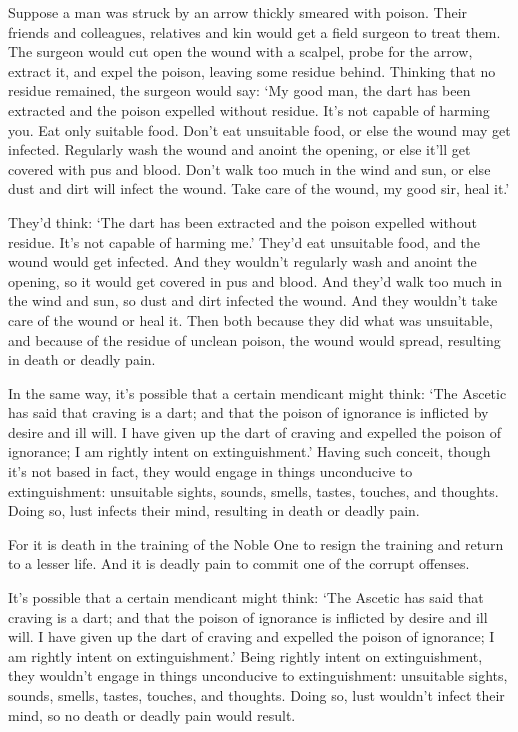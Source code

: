 \documentclass[12pt,openany]{book}%
\begin{document}
Suppose a man was struck by an arrow thickly smeared with poison. Their friends and colleagues, relatives and kin would get a field surgeon to treat them. The surgeon would cut open the wound with a scalpel, probe for the arrow, extract it, and expel the poison, leaving some residue behind. Thinking that no residue remained, the surgeon would say: ‘My good man, the dart has been extracted and the poison expelled without residue. It’s not capable of harming you. Eat only suitable food. Don’t eat unsuitable food, or else the wound may get infected. Regularly wash the wound and anoint the opening, or else it’ll get covered with pus and blood. Don’t walk too much in the wind and sun, or else dust and dirt will infect the wound. Take care of the wound, my good sir, heal it.’ 

They’d think: ‘The dart has been extracted and the poison expelled without residue. It’s not capable of harming me.’ They’d eat unsuitable food, and the wound would get infected. And they wouldn’t regularly wash and anoint the opening, so it would get covered in pus and blood. And they’d walk too much in the wind and sun, so dust and dirt infected the wound. And they wouldn’t take care of the wound or heal it. Then both because they did what was unsuitable, and because of the residue of unclean poison, the wound would spread, resulting in death or deadly pain. 

In the same way, it’s possible that a certain mendicant might think: ‘The Ascetic has said that craving is a dart; and that the poison of ignorance is inflicted by desire and ill will. I have given up the dart of craving and expelled the poison of ignorance; I am rightly intent on extinguishment.’ Having such conceit, though it’s not based in fact, they would engage in things unconducive to extinguishment: unsuitable sights, sounds, smells, tastes, touches, and thoughts. Doing so, lust infects their mind, resulting in death or deadly pain. 

For it is death in the training of the Noble One to resign the training and return to a lesser life. And it is deadly pain to commit one of the corrupt offenses. 

It’s possible that a certain mendicant might think: ‘The Ascetic has said that craving is a dart; and that the poison of ignorance is inflicted by desire and ill will. I have given up the dart of craving and expelled the poison of ignorance; I am rightly intent on extinguishment.’ Being rightly intent on extinguishment, they wouldn’t engage in things unconducive to extinguishment: unsuitable sights, sounds, smells, tastes, touches, and thoughts. Doing so, lust wouldn’t infect their mind, so no death or deadly pain would result. 
\end{document}
